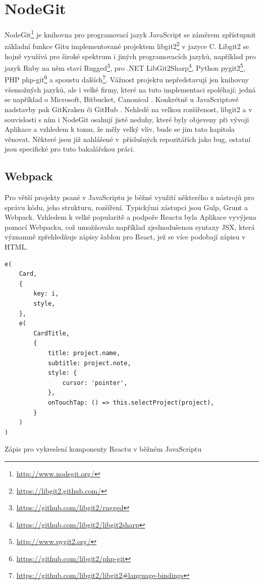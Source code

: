 \chapter{NodeGit}

NodeGit\footnote{\url{http://www.nodegit.org/}} je knihovna pro programovací jazyk JavaScript se záměrem zpřístupnit základní funkce Gitu implementované projektem libgit2\footnote{\url{https://libgit2.github.com/}} v jazyce C. Libgit2 se hojně využívá pro široké spektrum i jiných programovacích jazyků, například pro jazyk Ruby na něm staví Rugged\footnote{\url{https://github.com/libgit2/rugged}}, pro .NET LibGit2Sharp\footnote{\url{https://github.com/libgit2/libgit2sharp}}, Python pygit2\footnote{\url{http://www.pygit2.org/}}, PHP php-git\footnote{\url{https://github.com/libgit2/php-git}} a spoustu dalších\footnote{\url{https://github.com/libgit2/libgit2\#language-bindings}}. Vážnost projektu nepředstavují jen knihovny všemožných jazyků, ale i velké firmy, které na tuto implementaci spoléhají; jedná se například o Microsoft, Bitbucket, Canonical \cite{libgit2-companies}. Konkrétně u JavaScriptové nadstavby pak GitKraken či GitHub \cite{nodegit-products}. Nehledě na velkou rozšířenost, libgit2 a v souvislosti s ním i NodeGit osahují jisté neduhy, které byly objeveny při vývoji Aplikace a vzhledem k tomu, že měly velký vliv, bude se jim tato kapitola věnovat. Některé jsou již nahlášené v~příslušných repozitářích jako bug, ostatní jsou specifické pro tuto bakalářskou práci.

\section{Webpack}

Pro větší projekty psané v JavaScriptu je běžné využití některého z nástrojů pro správu kódu, jeho strukturu, rozšíření. Typickými zástupci jsou Gulp, Grunt a Webpack. Vzhledem k velké popularitě a podpoře Reactu byla Aplikace vyvýjena pomocí Webpacku, což umožňovalo například zjednodušenou syntaxy JSX, která významně zpřehledňuje zápisy šablon pro React, jež se více podobají zápisu v HTML.

\begin{listing}[ht]
\begin{verbatim}
e(
	Card,
	{
		key: i,
		style,
	},
	e(
		CardTitle,
		{
			title: project.name,
			subtitle: project.note,
			style: {
				cursor: 'pointer',
			},
			onTouchTap: () => this.selectProject(project),
		}
	)
)
\end{verbatim}
\caption[Komponenta v JavaScriptu]{Zápis pro vykreslení komponenty Reactu v běžném JavaScriptu}
\end{listing}

